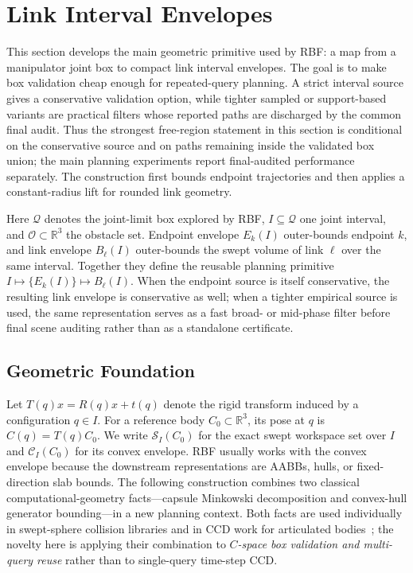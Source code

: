 \documentclass[journal]{IEEEtran}
\DeclareRobustCommand{\textsc}[1]{\textnormal{\MakeUppercase{#1}}}
\newcommand{\rbf}{\textsc{RBF}}
\newcommand{\Real}{\ensuremath{\mathbb{R}}}
\newcommand{\Q}{\ensuremath{\mathcal{Q}}}
\begin{document}
\section{Link Interval Envelopes}\label{sec:link_envelopes}

This section develops the main geometric primitive used by \rbf{}: a map from a
manipulator joint box to compact link interval envelopes. The goal is to make
box validation cheap enough for repeated-query planning. A strict interval
source gives a conservative validation option, while tighter sampled or
support-based variants are practical filters whose reported paths are discharged
by the common final audit. Thus the strongest free-region statement in this
section is conditional on the conservative source and on paths remaining inside
the validated box union; the main planning experiments report final-audited
performance separately. The construction first bounds endpoint trajectories and
then applies a constant-radius lift for rounded link geometry.

Here $\Q$ denotes the joint-limit box explored by \rbf{},
$I\subseteq\Q$ one joint interval, and $\mathcal{O}\subset\Real^3$ the obstacle
set. Endpoint envelope $E_k(I)$ outer-bounds endpoint $k$, and link envelope
$B_\ell(I)$ outer-bounds the swept volume of link $\ell$ over the same interval.
Together they define the reusable planning primitive
$I \mapsto \{E_k(I)\} \mapsto B_\ell(I)$. When the endpoint source is itself
conservative, the resulting link envelope is conservative as well; when a
tighter empirical source is used, the same representation serves as a fast
broad- or mid-phase filter before final scene auditing rather than as a
standalone certificate.

\subsection{Geometric Foundation}\label{sec:rewrite_geom}

Let $T(q)x = R(q)x + t(q)$ denote the rigid transform induced by a
configuration $q \in I$. For a reference body $C_0 \subset \Real^3$, its pose at
$q$ is $C(q)=T(q)C_0$. We write $\mathcal{S}_I(C_0)$ for the exact swept
workspace set over $I$ and $\mathcal{C}_I(C_0)$ for its convex envelope. \rbf{}
usually works with the convex envelope because the downstream representations
are AABBs, hulls, or fixed-direction slab bounds. The following construction
combines two classical computational-geometry facts---capsule Minkowski
decomposition and convex-hull generator bounding---in a new planning context.
Both facts are used individually in swept-sphere collision libraries and in
CCD work for articulated bodies~\cite{redon2004ccd_avatar,redon2005fast_artic};
the novelty here is applying their combination to \emph{$C$-space box
validation and multi-query reuse} rather than to single-query time-step CCD.
\end{document}
